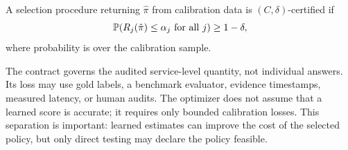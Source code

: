 \begin{definition}
\label{def:certified}
A selection procedure returning $\hat\pi$ from calibration data is
$(C,\delta)$-certified if
\[
\Prob\!\left(R_j(\hat\pi)\leq\alpha_j\ \text{for all }j\right)
\geq 1-\delta ,
\]
where probability is over the calibration sample.
\end{definition}

The contract governs the audited service-level quantity, not individual
answers. Its loss may use gold labels, a benchmark evaluator, evidence
timestamps, measured latency, or human audits. The optimizer does not
assume that a learned score is accurate; it requires only bounded
calibration losses. This separation is important: learned estimates can
improve the cost of the selected policy, but only direct testing may
declare the policy feasible.
